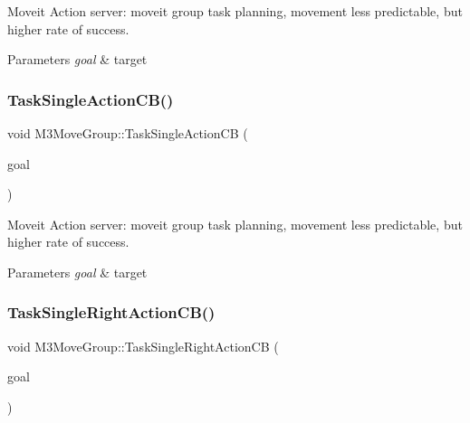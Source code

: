 Moveit Action server\+: moveit group task planning, movement less predictable, but higher rate of success. 


\begin{DoxyParams}{Parameters}
{\em goal} & target \\
\hline
\end{DoxyParams}
\mbox{\label{classM3MoveGroup_a5cbdff90f02f8067d55c1b4592b24b72}} 
\subsubsection{\texorpdfstring{Task\+Single\+Action\+C\+B()}{TaskSingleActionCB()}\hspace{0.1cm}{\footnotesize\ttfamily [2/2]}}
{\footnotesize\ttfamily void M3\+Move\+Group\+::\+Task\+Single\+Action\+CB (\begin{DoxyParamCaption}\item[{const m3\+\_\+moveit\+::\+Moveit\+Single\+Goal\+Const\+Ptr \&}]{goal }\end{DoxyParamCaption})\hspace{0.3cm}{\ttfamily [inline]}}



Moveit Action server\+: moveit group task planning, movement less predictable, but higher rate of success. 


\begin{DoxyParams}{Parameters}
{\em goal} & target \\
\hline
\end{DoxyParams}
\mbox{\label{classM3MoveGroup_aee17065b5aa40384dcca5a6589261ded}} 
\subsubsection{\texorpdfstring{Task\+Single\+Right\+Action\+C\+B()}{TaskSingleRightActionCB()}\hspace{0.1cm}{\footnotesize\ttfamily [1/2]}}
{\footnotesize\ttfamily void M3\+Move\+Group\+::\+Task\+Single\+Right\+Action\+CB (\begin{DoxyParamCaption}\item[{const m3\+\_\+moveit\+::\+Moveit\+Single\+Goal\+Const\+Ptr \&}]{goal }\end{DoxyParamCaption})\hspace{0.3cm}{\ttfamily [inline]}}



